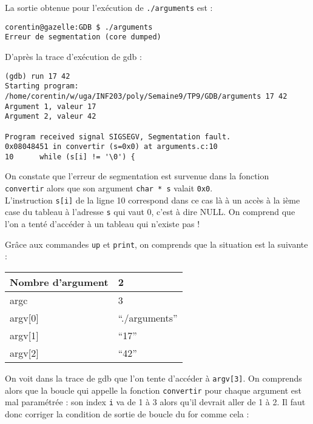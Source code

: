 \documentclass[10pt]{article}
\begin{document}
\begin{enumerate}[label=\textbf{[\alph*]}]
  \setlength\itemsep{1em}

\item La sortie obtenue pour l'exécution de \texttt{./arguments} est :

\begin{verbatim}
corentin@gazelle:GDB $ ./arguments
Erreur de segmentation (core dumped)
\end{verbatim}

\item D'après la trace d'exécution de gdb :

\begin{verbatim}
(gdb) run 17 42
Starting program: /home/corentin/w/uga/INF203/poly/Semaine9/TP9/GDB/arguments 17 42
Argument 1, valeur 17
Argument 2, valeur 42

Program received signal SIGSEGV, Segmentation fault.
0x08048451 in convertir (s=0x0) at arguments.c:10
10		while (s[i] != '\0') {
\end{verbatim}

On constate que l'erreur de segmentation est survenue dans la fonction
\texttt{convertir} alors que son argument \texttt{char * s} valait
\texttt{0x0}. \\

L'instruction \texttt{s[i]} de la ligne 10 correspond dans ce cas là à
un accès à la ième case du tableau à l'adresse \texttt{s} qui vaut
0, c'est à dire NULL. On comprend que l'on a tenté d'accéder à un
tableau qui n'existe pas !

\item Grâce aux commandes \texttt{up} et \texttt{print}, on comprends
  que la situation est la suivante :

  \begin{tabular}{|l|l|}
    \hline
    Nombre d'argument  & 2               \\ \hline
    argc               & 3               \\ \hline
    argv[0]            & ``./arguments'' \\ \hline
    argv[1]            & ``17''          \\ \hline
    argv[2]            & ``42''          \\ \hline
  \end{tabular}

  On voit dans la trace de gdb que l'on tente d'accéder à
  \texttt{argv[3]}. On comprends alors que la boucle qui appelle la
  fonction \texttt{convertir} pour chaque argument est mal paramétrée
  : son index \texttt{i} va de 1 à 3 alors qu'il devrait aller de 1 à
  2. Il faut donc corriger la condition de sortie de boucle du for
  comme cela :


\end{enumerate}
\end{document}
